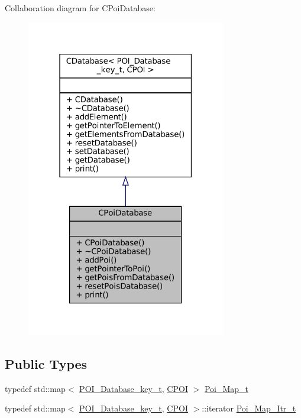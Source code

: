 Collaboration diagram for C\+Poi\+Database\+:
\nopagebreak
\begin{figure}[H]
\begin{center}
\leavevmode
\includegraphics[width=247pt]{classCPoiDatabase__coll__graph}
\end{center}
\end{figure}
\subsection*{Public Types}
\begin{DoxyCompactItemize}
\item 
typedef std\+::map$<$ \hyperlink{CPoiDatabase_8h_ad55418fc31c1491ccfbd50da54f494a0}{P\+O\+I\+\_\+\+Database\+\_\+key\+\_\+t}, \hyperlink{classCPOI}{C\+P\+OI} $>$ \hyperlink{classCPoiDatabase_ad9ed38adc9bf4250e704cd3d378176a2}{Poi\+\_\+\+Map\+\_\+t}
\item 
typedef std\+::map$<$ \hyperlink{CPoiDatabase_8h_ad55418fc31c1491ccfbd50da54f494a0}{P\+O\+I\+\_\+\+Database\+\_\+key\+\_\+t}, \hyperlink{classCPOI}{C\+P\+OI} $>$\+::iterator \hyperlink{classCPoiDatabase_ac9ec3b0a5e8efee92521eeb03aa0b198}{Poi\+\_\+\+Map\+\_\+\+Itr\+\_\+t}
\end{DoxyCompactItemize}
